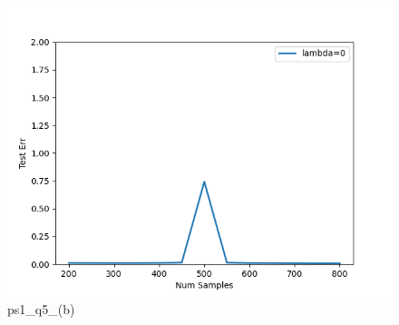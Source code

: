 
\begin{answer}

\begin{figure}[H]
    \centering
    \includegraphics[width=0.5\linewidth]{unreg.png}
    \caption{ps1\_q5\_(b)}
    \label{fig:enter-label}
\end{figure}
\end{answer}
